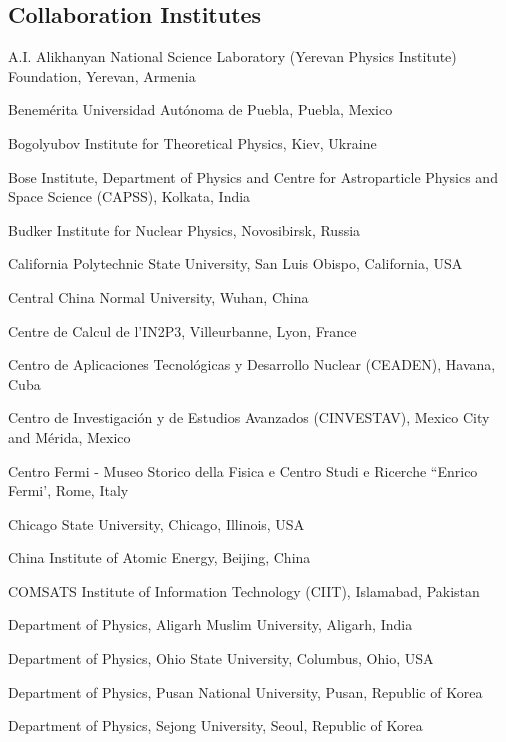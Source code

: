 \begin{flushleft}
\section*{Collaboration Institutes}
\renewcommand\theenumi{\arabic{enumi}~}
\begin{Authlist}
\item {}A.I. Alikhanyan National Science Laboratory (Yerevan Physics Institute) Foundation, Yerevan, Armenia
\item {}Benem\'{e}rita Universidad Aut\'{o}noma de Puebla, Puebla, Mexico
\item {}Bogolyubov Institute for Theoretical Physics, Kiev, Ukraine
\item {}Bose Institute, Department of Physics  and Centre for Astroparticle Physics and Space Science (CAPSS), Kolkata, India
\item {}Budker Institute for Nuclear Physics, Novosibirsk, Russia
\item {}California Polytechnic State University, San Luis Obispo, California, USA
\item {}Central China Normal University, Wuhan, China
\item {}Centre de Calcul de l'IN2P3, Villeurbanne, Lyon, France
\item {}Centro de Aplicaciones Tecnol\'{o}gicas y Desarrollo Nuclear (CEADEN), Havana, Cuba
\item {}Centro de Investigaci\'{o}n y de Estudios Avanzados (CINVESTAV), Mexico City and M\'{e}rida, Mexico
\item {}Centro Fermi - Museo Storico della Fisica e Centro Studi e Ricerche ``Enrico Fermi', Rome, Italy
\item {}Chicago State University, Chicago, Illinois, USA
\item {}China Institute of Atomic Energy, Beijing, China
\item {}COMSATS Institute of Information Technology (CIIT), Islamabad, Pakistan
\item {}Department of Physics, Aligarh Muslim University, Aligarh, India
\item {}Department of Physics, Ohio State University, Columbus, Ohio, USA
\item {}Department of Physics, Pusan National University, Pusan, Republic of Korea
\item {}Department of Physics, Sejong University, Seoul, Republic of Korea

\end{Authlist}
\end{flushleft}
